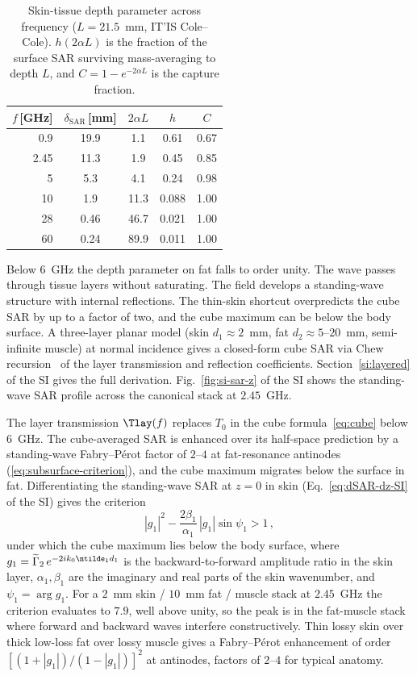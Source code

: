 \begin{table}[!t]
\centering
\caption{Skin-tissue depth parameter across frequency
($L = 21.5$~mm, IT'IS Cole--Cole). $h(2\alpha L)$ is the fraction of
the surface SAR surviving mass-averaging to depth $L$, and
$C = 1 - e^{-2\alpha L}$ is the capture fraction.}\label{tab:depth}
\small
\begin{tabular}{rcccc}
\toprule
$f$\,[GHz] & $\delta_{\mathrm{SAR}}$\,[mm] & $2\alpha L$ & $h$ & $C$ \\
\midrule
0.9  & 19.9 &  1.1 & 0.61  & 0.67 \\
2.45 & 11.3 &  1.9 & 0.45  & 0.85 \\
5    &  5.3 &  4.1 & 0.24  & 0.98 \\
10   &  1.9 & 11.3 & 0.088 & 1.00 \\
28   & 0.46 & 46.7 & 0.021 & 1.00 \\
60   & 0.24 & 89.9 & 0.011 & 1.00 \\
\bottomrule
\end{tabular}
\end{table}

Below $6$~GHz the depth parameter on fat falls to order unity. The
wave passes through tissue layers without saturating. The field
develops a standing-wave structure with internal reflections. The
thin-skin shortcut overpredicts the cube SAR by up to a factor of
two, and the cube maximum can be below the body surface. A three-layer planar
model (skin $d_1 \approx 2$~mm, fat $d_2 \approx 5$--$20$~mm,
semi-infinite muscle) at normal incidence gives a closed-form cube
SAR via Chew recursion~\cite{Chew1995} of the layer transmission and
reflection coefficients. Section~\ref{si:layered} of the SI gives
the full derivation. Fig.~\ref{fig:si-sar-z} of the SI shows the
standing-wave SAR profile across the canonical stack at $2.45$~GHz.

The layer transmission $\Tlay(f)$ replaces
$T_0$ in the cube formula~\eqref{eq:cube} below $6$~GHz. The
cube-averaged SAR is enhanced over its half-space prediction by a
standing-wave Fabry--P\'erot factor of $2$--$4$ at fat-resonance
antinodes (\cref{eq:subsurface-criterion}), and the cube maximum
migrates below the surface in fat. Differentiating the standing-wave
SAR at $z = 0$ in skin (Eq.~\ref{eq:dSAR-dz-SI} of the SI) gives the
criterion
\begin{equation}\label{eq:subsurface-criterion}
  |g_1|^2 - \frac{2\beta_1}{\alpha_1}\,|g_1|\sin\psi_1 > 1\, ,
\end{equation}
under which the cube maximum lies below the body surface, where
$g_1 = \widetilde\Gamma_2\,e^{-2 i k_0 \ntilde_1 d_1}$ is the
backward-to-forward amplitude ratio in the skin layer,
$\alpha_1, \beta_1$ are the imaginary and real parts of the skin
wavenumber, and $\psi_1 = \arg g_1$. For a $2$~mm skin / $10$~mm
fat / muscle stack at $2.45$~GHz the criterion evaluates to $7.9$,
well above unity, so the peak is in the fat-muscle stack where
forward and backward waves interfere constructively. Thin lossy skin
over thick low-loss fat over lossy muscle gives a Fabry--P\'erot
enhancement of order $[(1+|g_1|)/(1-|g_1|)]^2$ at antinodes, factors
of $2$--$4$ for typical anatomy.
